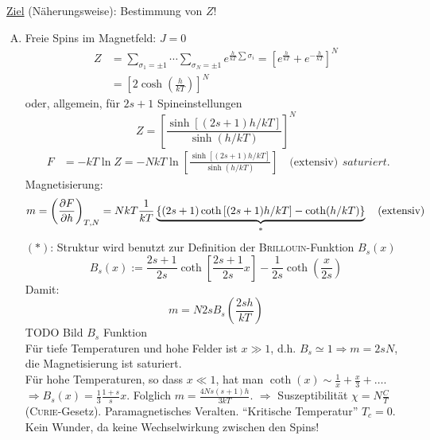 \underline{Ziel} (Näherungsweise): Bestimmung von $Z$!
\begin{enumerate}[A)]
    \item Freie Spins im Magnetfeld: $J = 0$
    \begin{equation}
        \begin{split}
            Z &= \sum_{\sigma_1 = \pm 1} \cdots \sum_{\sigma_N = \pm 1} e^{ \frac{h}{kT} \sum \sigma_i } = \left[ e^{\frac{h}{kT}} + e^{-\frac{h}{kT}} \right]^N \\
            &= \left[2 \cosh \left( \frac{h}{kT} \right) \right]^N
        \end{split}
    \end{equation}
    oder, allgemein, für $2s+1$ Spineinstellungen
    \begin{equation}
        Z = \left[ \frac{\sinh \left[ (2s+1) h / kT \right]}{\sinh (h/kT)} \right]^N
    \end{equation}
    \begin{equation}
        \begin{split}
            F &= - k T \ln Z = - N k T \ln \left[  \frac{\sinh \left[ (2s+1) h / kT \right]}{\sinh (h/kT)} \right] \quad \text{(extensiv)}
        \end{split}saturiert.
    \end{equation}
    Magnetisierung:
    \begin{equation}
        m = \left( \frac{\partial F}{\partial h} \right)_{T, N} = N k T \frac{1}{k T} \underbrace{\left\{ (2s+1) \coth \left[ (2s+1) h/kT \right] - \coth(h/kT)  \right\}}_{*} \quad \text{(extensiv)}
    \end{equation}
    $(*)$: Struktur wird benutzt zur Definition der \textsc{Brillouin}-Funktion $B_s(x)$
    \begin{equation}
        B_s(x) := \frac{2s+1}{2s} \coth \left[ \frac{2s+1}{2s} x \right] - \frac{1}{2s} \coth \left( \frac{x}{2s} \right)
    \end{equation}
    Damit:
    \begin{equation}
        m = N 2 s B_s \left( \frac{2 s h}{k T} \right)
    \end{equation}
    TODO Bild $B_s$ Funktion \\ %
    Für tiefe Temperaturen und hohe Felder ist $x \gg 1$, d.h. $B_s \simeq 1 \Rightarrow m = 2 s N$, die Magnetisierung ist saturiert. \\
    Für hohe Temperaturen, so dass $x \ll 1$, hat man $\coth(x) \sim \frac{1}{x} + \frac{x}{3} + \ldots$.
    $\Rightarrow B_s(x) = \frac{1}{3} \frac{1+s}{s} x$. Folglich $m = \frac{4 N s (s+1) h}{3 k T}$. $\Rightarrow$ Suszeptibilität $\chi = N \frac{C}{T}$ (\textsc{Curie}-Gesetz).
    Paramagnetisches Veralten. "`Kritische Temperatur"' $T_c = 0$. Kein Wunder, da keine Wechselwirkung zwischen den Spins!
    

\end{enumerate}
